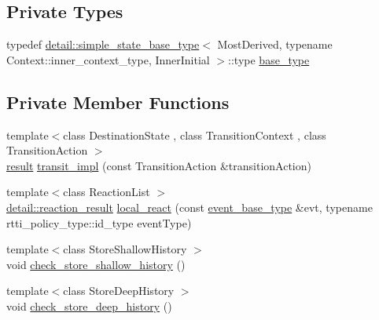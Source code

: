 \subsection*{Private Types}
\begin{DoxyCompactItemize}
\item 
typedef \mbox{\hyperlink{structboost_1_1statechart_1_1detail_1_1simple__state__base__type}{detail\+::simple\+\_\+state\+\_\+base\+\_\+type}}$<$ Most\+Derived, typename Context\+::inner\+\_\+context\+\_\+type, Inner\+Initial $>$\+::type \mbox{\hyperlink{classboost_1_1statechart_1_1simple__state_a0a4e135c0eb6d114bd2e3e6e61ea3d5f}{base\+\_\+type}}
\end{DoxyCompactItemize}
\subsection*{Private Member Functions}
\begin{DoxyCompactItemize}
\item 
{\footnotesize template$<$class Destination\+State , class Transition\+Context , class Transition\+Action $>$ }\\\mbox{\hyperlink{namespaceboost_1_1statechart_abe807f6598b614d6d87bb951ecd92331}{result}} \mbox{\hyperlink{classboost_1_1statechart_1_1simple__state_aa5c1618d959d881a51de119d12f6fc80}{transit\+\_\+impl}} (const Transition\+Action \&transition\+Action)
\item 
{\footnotesize template$<$class Reaction\+List $>$ }\\\mbox{\hyperlink{namespaceboost_1_1statechart_1_1detail_ab091bbb4c29327fb46ee479ea1b7255b}{detail\+::reaction\+\_\+result}} \mbox{\hyperlink{classboost_1_1statechart_1_1simple__state_ac523a4a47f87c4e327d603286bb91b96}{local\+\_\+react}} (const \mbox{\hyperlink{classboost_1_1statechart_1_1simple__state_a153e115715f5d828021a273ce282ba9b}{event\+\_\+base\+\_\+type}} \&evt, typename rtti\+\_\+policy\+\_\+type\+::id\+\_\+type event\+Type)
\item 
{\footnotesize template$<$class Store\+Shallow\+History $>$ }\\void \mbox{\hyperlink{classboost_1_1statechart_1_1simple__state_a526c05c663958e216ab04dbdbf7ba6c5}{check\+\_\+store\+\_\+shallow\+\_\+history}} ()
\item 
{\footnotesize template$<$class Store\+Deep\+History $>$ }\\void \mbox{\hyperlink{classboost_1_1statechart_1_1simple__state_a5f704c34f439bc3cb3c7f547405da725}{check\+\_\+store\+\_\+deep\+\_\+history}} ()
\end{DoxyCompactItemize}

